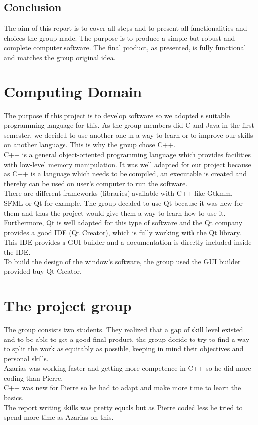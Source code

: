 \section{Conclusion}
The aim of this report is to cover all steps and to present all functionalities and choices the group made. The purpose is to produce a simple but robust and complete computer software. The final product, as presented, is fully functional and matches the group original idea.  

\chapter{Computing Domain}
The purpose if this project is to develop software so we adopted s suitable programming language for this. As the group members did C and Java in the first semester, we decided to use another one in a way to learn or to improve our skills on another language. This is why the group chose C++.
\\
C++ is a general object-oriented programming language which provides facilities with low-level memory manipulation. It was well adapted for our project because as C++ is a language which needs to be compiled, an executable is created and thereby can be used on user's computer to run the software. 
\\
There are different frameworks (libraries) available with C++ like Gtkmm, SFML or Qt for example. The group decided to use Qt because it was new for them and thus the project would give them a way to learn how to use it. Furthermore, Qt is well adapted for this type of software and the Qt company provides a good IDE (Qt Creator), which is fully working with the Qt library. This IDE provides a GUI builder and a documentation is directly included inside the IDE. 
\\
To build the design of the window's software, the group used the GUI builder provided buy Qt Creator.

\chapter{The project group}
The group consists two students. They realized that a gap of skill level existed and to be able to get a good final product, the group decide to try to find a way to split the work as equitably as possible, keeping in mind their objectives and personal skills.
\\
Azarias was working faster and getting more competence in C++ so he did more coding than Pierre. 
\\
C++ was new for Pierre so he had to adapt and make more time to learn the basics. 
\\
The report writing skills was pretty equals but as Pierre coded less he tried to spend more time as Azarias on this. 

